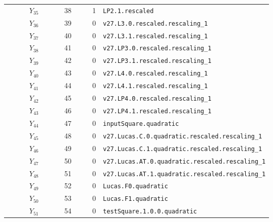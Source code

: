 {\begin{longtable}{@{}r r r p{0.64\linewidth}@{}}
\(Y_{35}\) & 38 & 1 & \texttt{LP2.\allowbreak{}1.\allowbreak{}rescaled} \\
\(Y_{36}\) & 39 & 0 & \texttt{v27.\allowbreak{}L3.\allowbreak{}0.\allowbreak{}rescaled.\allowbreak{}rescaling\_1} \\
\(Y_{37}\) & 40 & 0 & \texttt{v27.\allowbreak{}L3.\allowbreak{}1.\allowbreak{}rescaled.\allowbreak{}rescaling\_1} \\
\(Y_{38}\) & 41 & 0 & \texttt{v27.\allowbreak{}LP3.\allowbreak{}0.\allowbreak{}rescaled.\allowbreak{}rescaling\_1} \\
\(Y_{39}\) & 42 & 0 & \texttt{v27.\allowbreak{}LP3.\allowbreak{}1.\allowbreak{}rescaled.\allowbreak{}rescaling\_1} \\
\(Y_{40}\) & 43 & 0 & \texttt{v27.\allowbreak{}L4.\allowbreak{}0.\allowbreak{}rescaled.\allowbreak{}rescaling\_1} \\
\(Y_{41}\) & 44 & 0 & \texttt{v27.\allowbreak{}L4.\allowbreak{}1.\allowbreak{}rescaled.\allowbreak{}rescaling\_1} \\
\(Y_{42}\) & 45 & 0 & \texttt{v27.\allowbreak{}LP4.\allowbreak{}0.\allowbreak{}rescaled.\allowbreak{}rescaling\_1} \\
\(Y_{43}\) & 46 & 0 & \texttt{v27.\allowbreak{}LP4.\allowbreak{}1.\allowbreak{}rescaled.\allowbreak{}rescaling\_1} \\
\(Y_{44}\) & 47 & 0 & \texttt{inputSquare.\allowbreak{}quadratic} \\
\(Y_{45}\) & 48 & 0 & \texttt{v27.\allowbreak{}Lucas.\allowbreak{}C.\allowbreak{}0.\allowbreak{}quadratic.\allowbreak{}rescaled.\allowbreak{}rescaling\_1} \\
\(Y_{46}\) & 49 & 0 & \texttt{v27.\allowbreak{}Lucas.\allowbreak{}C.\allowbreak{}1.\allowbreak{}quadratic.\allowbreak{}rescaled.\allowbreak{}rescaling\_1} \\
\(Y_{47}\) & 50 & 0 & \texttt{v27.\allowbreak{}Lucas.\allowbreak{}AT.\allowbreak{}0.\allowbreak{}quadratic.\allowbreak{}rescaled.\allowbreak{}rescaling\_1} \\
\(Y_{48}\) & 51 & 0 & \texttt{v27.\allowbreak{}Lucas.\allowbreak{}AT.\allowbreak{}1.\allowbreak{}quadratic.\allowbreak{}rescaled.\allowbreak{}rescaling\_1} \\
\(Y_{49}\) & 52 & 0 & \texttt{Lucas.\allowbreak{}F0.\allowbreak{}quadratic} \\
\(Y_{50}\) & 53 & 0 & \texttt{Lucas.\allowbreak{}F1.\allowbreak{}quadratic} \\
\(Y_{51}\) & 54 & 0 & \texttt{testSquare.\allowbreak{}1.\allowbreak{}0.\allowbreak{}0.\allowbreak{}quadratic} \\

\end{longtable}}
